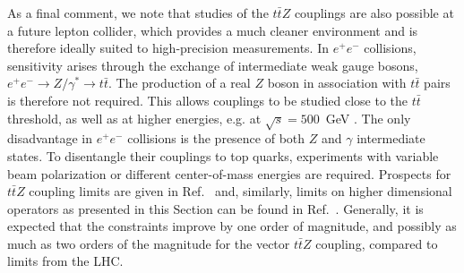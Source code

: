 \documentclass{JHEP3}
\def\ttbZ{t\bar{t}Z}
\def\ttb{t\bar{t}}
\begin{document}
As a final comment, we note that studies of the $\ttbZ$ couplings are also possible at a future lepton collider,
which provides a much cleaner environment and is therefore ideally suited to high-precision measurements.
In $e^+e^-$ collisions, sensitivity arises through the exchange of intermediate weak gauge bosons, $e^+e^- \to Z/\gamma^* \to \ttb$.
The production of a real $Z$ boson in association with $\ttb$ pairs is therefore not required.
This allows couplings to be studied close to the $\ttb$ threshold, as well as at higher energies, e.g. at $\sqrt{s}=500$~GeV \cite{Abe:2001swa,Adelman:2013gis,Amjad:2013tlv}.
The only disadvantage in $e^+e^-$ collisions is the presence of both $Z$ and $\gamma$ intermediate states. 
To disentangle their couplings to top quarks, experiments with variable beam polarization or different center-of-mass energies are required.
Prospects for $\ttbZ$ coupling limits are given in Ref.~\cite{Devetak:2010n} and, similarly, limits on higher dimensional operators 
as presented in this Section can be found in Ref.~\cite{AguilarSaavedra:2012vh}.
Generally, it is expected that the constraints improve by one order of magnitude, and possibly as much as two orders of the magnitude for the vector $\ttbZ$ coupling, 
compared to limits from the LHC. 

\end{document}
